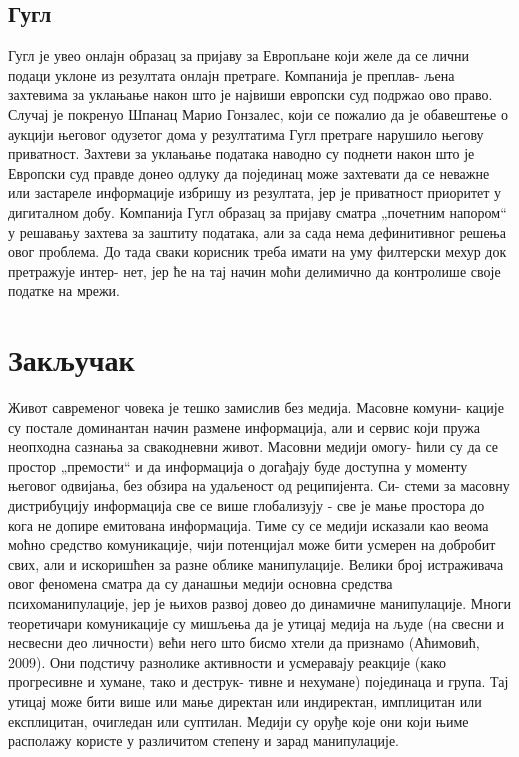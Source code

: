 \documentclass[a4paper]{article}
\begin{document}
\subsection{Гугл}
\label{podnaslov8}

Гугл је увео онлајн образац за пријаву за Европљане који желе да се лични подаци уклоне из резултата онлајн претраге. Компанија је преплав-
љена захтевима за уклањање након што је највиши европски суд подржао ово право. Случај је покренуо
Шпанац Марио Гонзалес, који се пожалио да је обавештење о аукцији његовог одузетог дома у резултатима Гугл претраге нарушило његову приватност. Захтеви за уклањање података наводно су поднети након што је Европски суд правде донео одлуку да појединац може захтевати да се неважне или застареле информације избришу из резултата, јер је приватност приоритет у дигиталном добу. Компанија Гугл образац за пријаву сматра „почетним напором“ у решавању захтева за заштиту података, али за сада нема дефинитивног решења овог проблема. До тада сваки корисник треба имати на уму филтерски мехур док претражује интер-
нет, јер ће на тај начин моћи делимично да контролише своје податке на мрежи.


\newpage
\section{Закључак}
\label{sec:zakljucak}

Живот савременог човека је тешко замислив без медија. Масовне комуни-
кације су постале доминантан начин размене информација, али и сервис који пружа неопходна сазнања за свакодневни живот. Масовни медији омогу-
ћили су да се простор „премости“ и да информација о догађају буде доступна у моменту његовог одвијања, без обзира на удаљеност од реципијента. Си-
стеми за масовну дистрибуцију информација све се више глобализују - све је мање простора до кога не допире емитована информација. Тиме су се медији исказали као веома моћно средство комуникације, чији потенцијал може бити усмерен на добробит свих, али и искоришћен за разне облике манипулације. Велики број истраживача овог феномена сматра да су данашњи медији основна средства психоманипулације, јер је њихов развој довео до динамичне манипулације. Многи теоретичари комуникације су мишљења да је утицај медија на људе (на свесни и несвесни део личности) већи него што бисмо хтели да признамо (Аћимовић, 2009). Они подстичу разнолике активности и усмеравају реакције (како прогресивне и хумане, тако и деструк-
тивне и нехумане) појединаца и група. Тај утицај може бити више или мање директан или индиректан, имплицитан или експлицитан, очигледан или суптилан. Медији су оруђе које они који њиме располажу користе у различитом степену и зарад манипулације.
\end{document}
